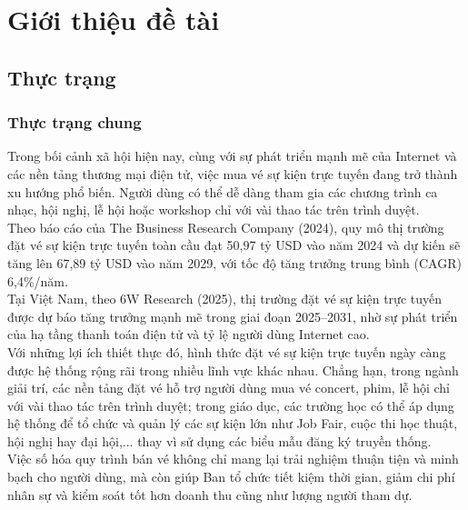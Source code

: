 \section{Giới thiệu đề tài}
\subsection{Thực trạng}
\subsubsection{Thực trạng chung}
\indent \indent Trong bối cảnh xã hội hiện nay, cùng với sự phát triển mạnh mẽ của Internet và các nền tảng thương mại điện tử, việc mua vé sự kiện trực tuyến đang trở thành xu hướng phổ biến. Người dùng có thể dễ dàng tham gia các chương trình ca nhạc, hội nghị, lễ hội hoặc workshop chỉ với vài thao tác trên trình duyệt.\\
\indent Theo báo cáo của The Business Research Company (2024), quy mô thị trường đặt vé sự kiện trực tuyến toàn cầu đạt 50,97 tỷ USD vào năm 2024 và dự kiến sẽ tăng lên 67,89 tỷ USD vào năm 2029, với tốc độ tăng trưởng trung bình (CAGR) 6,4\%/năm.\\
\indent Tại Việt Nam, theo 6W Research (2025), thị trường đặt vé sự kiện trực tuyến được dự báo tăng trưởng mạnh mẽ trong giai đoạn 2025–2031, nhờ sự phát triển của hạ tầng thanh toán điện tử và tỷ lệ người dùng Internet cao. \\
\indent Với những lợi ích thiết thực đó, hình thức đặt vé sự kiện trực tuyến ngày càng được hệ thống rộng rãi trong nhiều lĩnh vực khác nhau. Chẳng hạn, trong ngành giải trí, các nền tảng đặt vé hỗ trợ người dùng mua vé concert, phim, lễ hội chỉ với vài thao tác trên trình duyệt; trong giáo dục, các trường học có thể áp dụng hệ thống để tổ chức và quản lý các sự kiện lớn như Job Fair, cuộc thi học thuật, hội nghị hay đại hội,... thay vì sử dụng các biểu mẫu đăng ký truyền thống. \\
\indent Việc số hóa quy trình bán vé không chỉ mang lại trải nghiệm thuận tiện và minh bạch cho người dùng, mà còn giúp Ban tổ chức tiết kiệm thời gian, giảm chi phí nhân sự và kiểm soát tốt hơn doanh thu cũng như lượng người tham dự.
